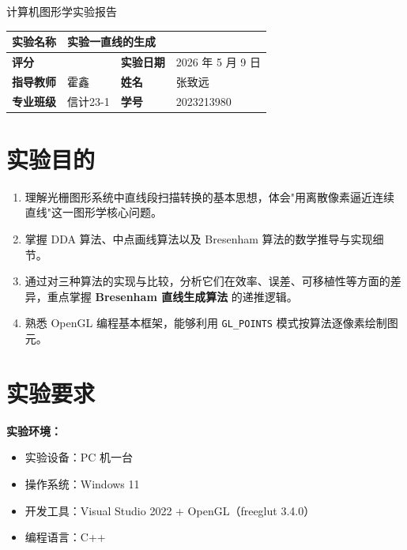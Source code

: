 \documentclass[a4paper,12pt]{ctexart}
\newcommand{\expname}{实验一\quad 直线的生成}
\newcommand{\expscore}{}
\newcommand{\expdate}{2026 年 5 月 9 日}
\newcommand{\expteacher}{霍鑫}
\newcommand{\expauthor}{张致远}
\newcommand{\expclass}{信计23-1}
\newcommand{\expid}{2023213980}
\begin{document}
\begin{center}
    {\heiti 计算机图形学实验报告}
\end{center}
\vspace{0.5em}

\renewcommand{\arraystretch}{1.6}
\noindent
\begin{tabular}{|>{\centering\arraybackslash}m{2.2cm}|m{4.4cm}|>{\centering\arraybackslash}m{2.2cm}|m{4.4cm}|}
    \hline
    \textbf{实验名称} & \multicolumn{3}{l|}{\expname} \\ \hline
    \textbf{评分}     & \expscore   & \textbf{实验日期} & \expdate    \\ \hline
    \textbf{指导教师} & \expteacher & \textbf{姓名}     & \expauthor  \\ \hline
    \textbf{专业班级} & \expclass   & \textbf{学号}     & \expid      \\ \hline
\end{tabular}
\vspace{1.5em}

\section{实验目的}

\begin{enumerate}[leftmargin=2em,itemsep=0.2em]
    \item 理解光栅图形系统中直线段扫描转换的基本思想，体会"用离散像素逼近连续直线"这一图形学核心问题。
    \item 掌握 DDA 算法、中点画线算法以及 Bresenham 算法的数学推导与实现细节。
    \item 通过对三种算法的实现与比较，分析它们在效率、误差、可移植性等方面的差异，重点掌握 \textbf{Bresenham 直线生成算法} 的递推逻辑。
    \item 熟悉 OpenGL 编程基本框架，能够利用 \texttt{GL\_POINTS} 模式按算法逐像素绘制图元。
\end{enumerate}

\section{实验要求}

\textbf{实验环境：}
\begin{itemize}[leftmargin=2em,itemsep=0.2em]
    \item 实验设备：PC 机一台
    \item 操作系统：Windows 11
    \item 开发工具：Visual Studio 2022 + OpenGL（freeglut 3.4.0）
    \item 编程语言：C++
\end{itemize}
\end{document}
